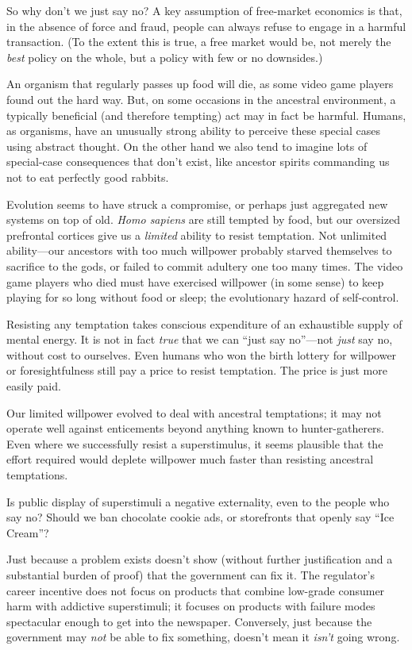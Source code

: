 {
 So why don't we just say no? A key assumption of
free-market economics is that, in the absence of force and fraud,
people can always refuse to engage in a harmful transaction. (To the
extent this is true, a free market would be, not merely the
\textit{best} policy on the whole, but a policy with few or no
downsides.)}

{
 An organism that regularly passes up food will die, as some video
game players found out the hard way. But, on some occasions in the
ancestral environment, a typically beneficial (and therefore tempting)
act may in fact be harmful. Humans, as organisms, have an unusually
strong ability to perceive these special cases using abstract thought.
On the other hand we also tend to imagine lots of special-case
consequences that don't exist, like ancestor spirits
commanding us not to eat perfectly good rabbits.}

{
 Evolution seems to have struck a compromise, or perhaps just
aggregated new systems on top of old. \textit{Homo sapiens} are still
tempted by food, but our oversized prefrontal cortices give us a
\textit{limited} ability to resist temptation. Not unlimited
ability---our ancestors with too much willpower probably starved
themselves to sacrifice to the gods, or failed to commit adultery one
too many times. The video game players who died must have exercised
willpower (in some sense) to keep playing for so long without food or
sleep; the evolutionary hazard of self-control.}

{
 Resisting any temptation takes conscious expenditure of an
exhaustible supply of mental energy. It is not in fact \textit{true}
that we can ``just say no''---not
\textit{just} say no, without cost to ourselves. Even humans who won
the birth lottery for willpower or foresightfulness still pay a price
to resist temptation. The price is just more easily paid.}

{
 Our limited willpower evolved to deal with ancestral temptations;
it may not operate well against enticements beyond anything known to
hunter-gatherers. Even where we successfully resist a superstimulus, it
seems plausible that the effort required would deplete willpower much
faster than resisting ancestral temptations.}

{
 Is public display of superstimuli a negative externality, even to
the people who say no? Should we ban chocolate cookie ads, or
storefronts that openly say ``Ice
Cream''?}

{
 Just because a problem exists doesn't show
(without further justification and a substantial burden of proof) that
the government can fix it. The regulator's career
incentive does not focus on products that combine low-grade consumer
harm with addictive superstimuli; it focuses on products with failure
modes spectacular enough to get into the newspaper. Conversely, just
because the government may \textit{not} be able to fix something,
doesn't mean it \textit{isn't} going
wrong.}

